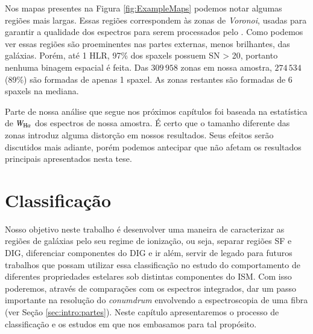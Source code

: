 Nos mapas presentes na Figura \ref{fig:ExampleMaps} podemos notar algumas regiões mais largas. Essas regiões correspondem às zonas de {\em Voronoi}, usadas para garantir a qualidade dos espectros para serem processados pelo \starlight. Como podemos ver essas regiões são proeminentes nas partes externas, menos brilhantes, das galáxias. Porém, até 1 HLR, 97\% dos spaxels possuem SN > 20, portanto nenhuma binagem espacial é feita. Das $309\,958$ zonas em nossa amostra, $274\,534$ (89\%) são formadas de apenas 1 spaxel. As zonas restantes são formadas de 6 spaxels na mediana.

Parte de nossa análise que segue nos próximos capítulos foi baseada na estatística de $W_{\Ha}$ dos espectros de nossa amostra. É certo que o tamanho diferente das zonas introduz alguma distorção em nossos resultados. Seus efeitos serão discutidos mais adiante, porém podemos antecipar que não afetam os resultados principais apresentados nesta tese.




\chapter{Classificação}
\label{sec:DIGclass}

Nosso objetivo neste trabalho é desenvolver uma maneira de caracterizar as regiões de galáxias pelo seu regime de ionização, ou seja, separar regiões SF e DIG, diferenciar componentes do DIG e ir além, servir de legado para futuros trabalhos que possam utilizar essa classificação no estudo do comportamento de diferentes propriedades estelares sob distintas componentes do ISM. Com isso poderemos, através de comparações com os espectros integrados, dar um passo importante na resolução do {\em conumdrum} envolvendo a espectroscopia de uma fibra (ver Seção \ref{sec:intro:partes}). Neste capítulo apresentaremos o processo de classificação e os estudos em que nos embasamos para tal propósito.

